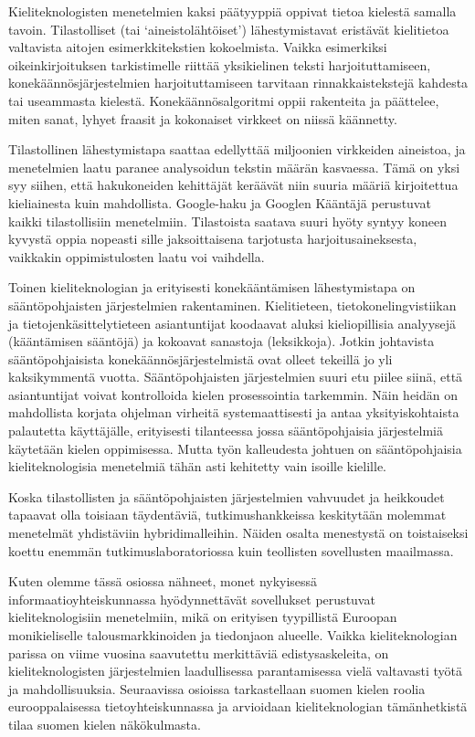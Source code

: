 \documentclass[]{../../metanetpaper}
\begin{document}
\begin{Parallel}[c]{77mm}{77mm}
{Kieliteknologisten menetelmien kaksi päätyyppiä oppivat tietoa kielestä samalla
tavoin. Tilastolliset (tai ‘aineistolähtöiset’) lähestymistavat eristävät
kielitietoa valtavista aitojen esimerkkitekstien kokoelmista. Vaikka
esimerkiksi oikeinkirjoituksen tarkistimelle riittää yksikielinen teksti
harjoituttamiseen, konekäännösjärjestelmien harjoituttamiseen tarvitaan
rinnakkaistekstejä kahdesta tai useammasta kielestä. Konekäännösalgoritmi oppii
rakenteita ja päättelee, miten sanat, lyhyet fraasit ja kokonaiset virkkeet on
niissä käännetty.

Tilastollinen lähestymistapa saattaa edellyttää miljoonien virkkeiden
aineistoa, ja menetelmien laatu paranee analysoidun tekstin määrän kasvaessa.
Tämä on yksi syy siihen, että hakukoneiden kehittäjät keräävät niin suuria
määriä kirjoitettua kieliainesta kuin mahdollista. Google-haku ja Googlen
Kääntäjä perustuvat kaikki tilastollisiin menetelmiin. Tilastoista saatava
suuri hyöty syntyy koneen kyvystä oppia nopeasti sille jaksoittaisena
tarjotusta harjoitusaineksesta, vaikkakin oppimistulosten laatu voi vaihdella.

Toinen kieliteknologian ja erityisesti konekääntämisen lähestymistapa on
sääntöpohjaisten järjestelmien rakentaminen. Kielitieteen,
tietokonelingvistiikan ja tietojenkäsittelytieteen asiantuntijat koodaavat
aluksi kieliopillisia analyysejä (kääntämisen sääntöjä) ja kokoavat sanastoja
(leksikkoja). Jotkin johtavista sääntöpohjaisista konekäännösjärjestelmistä
ovat olleet tekeillä jo yli kaksikymmentä vuotta. Sääntöpohjaisten
järjestelmien suuri etu piilee siinä, että asiantuntijat voivat kontrolloida
kielen prosessointia tarkemmin. Näin heidän on mahdollista korjata ohjelman
virheitä systemaattisesti ja antaa yksityiskohtaista palautetta käyttäjälle,
erityisesti tilanteessa jossa sääntöpohjaisia järjestelmiä käytetään kielen
oppimisessa. Mutta työn kalleudesta johtuen on sääntöpohjaisia
kieliteknologisia menetelmiä tähän asti kehitetty vain isoille kielille.

Koska tilastollisten ja sääntöpohjaisten järjestelmien vahvuudet ja heikkoudet
tapaavat olla toisiaan täydentäviä, tutkimushankkeissa keskitytään molemmat
menetelmät yhdistäviin hybridimalleihin. Näiden osalta menestystä on
toistaiseksi koettu enemmän tutkimuslaboratoriossa kuin teollisten sovellusten
maailmassa.

Kuten olemme tässä osiossa nähneet, monet nykyisessä informaatioyhteiskunnassa
hyödynnettävät sovellukset perustuvat kieliteknologisiin menetelmiin, mikä on
erityisen tyypillistä Euroopan monikieliselle talousmarkkinoiden ja tiedonjaon
alueelle. Vaikka kieliteknologian parissa on viime vuosina saavutettu
merkittäviä edistysaskeleita, on kieliteknologisten järjestelmien laadullisessa
parantamisessa vielä valtavasti työtä ja mahdollisuuksia. Seuraavissa osioissa
tarkastellaan suomen kielen roolia eurooppalaisessa tietoyhteiskunnassa ja
arvioidaan kieliteknologian tämänhetkistä tilaa suomen kielen näkökulmasta.
}


\end{Parallel}
\end{document}
